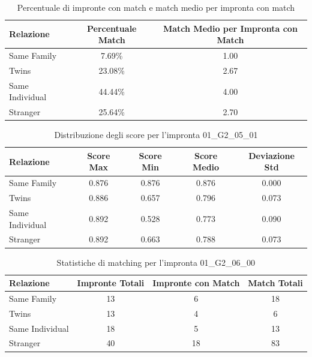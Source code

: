\begin{table}[htbp]
\centering
\caption{Percentuale di impronte con match e match medio per impronta con match}
\label{tab:match_percentage_01_G2_05_01}
\begin{tabular}{|l|c|c|}
\hline
\textbf{Relazione} & \textbf{Percentuale Match} & \textbf{Match Medio per Impronta con Match} \\
\hline
Same Family & 7.69\% & 1.00 \\
\hline
Twins & 23.08\% & 2.67 \\
\hline
Same Individual & 44.44\% & 4.00 \\
\hline
Stranger & 25.64\% & 2.70 \\
\hline
\end{tabular}
\end{table}


\begin{table}[htbp]
\centering
\caption{Distribuzione degli score per l'impronta 01\_G2\_05\_01}
\label{tab:scores_01_G2_05_01}
\begin{tabular}{|l|c|c|c|c|}
\hline
\textbf{Relazione} & \textbf{Score Max} & \textbf{Score Min} & \textbf{Score Medio} & \textbf{Deviazione Std} \\
\hline
Same Family & 0.876 & 0.876 & 0.876 & 0.000 \\
\hline
Twins & 0.886 & 0.657 & 0.796 & 0.073 \\
\hline
Same Individual & 0.892 & 0.528 & 0.773 & 0.090 \\
\hline
Stranger & 0.892 & 0.663 & 0.788 & 0.073 \\
\hline
\end{tabular}
\end{table}


\begin{table}[htbp]
\centering
\caption{Statistiche di matching per l'impronta 01\_G2\_06\_00}
\label{tab:results_01_G2_06_00}
\begin{tabular}{|l|c|c|c|}
\hline
\textbf{Relazione} & \textbf{Impronte Totali} & \textbf{Impronte con Match} & \textbf{Match Totali} \\
\hline
Same Family & 13 & 6 & 18 \\
\hline
Twins & 13 & 4 & 6 \\
\hline
Same Individual & 18 & 5 & 13 \\
\hline
Stranger & 40 & 18 & 83 \\
\hline
\end{tabular}
\end{table}


